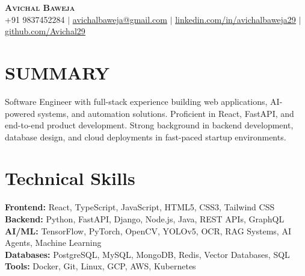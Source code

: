 \documentclass[letterpaper,10pt]{article}
\begin{document}
\begin{center}
    \textbf{\Huge \scshape Avichal Baweja} \\ \vspace{1pt}
    \small +91 9837452284 $|$ \href{mailto:avichalbaweja@gmail.com}{\underline{avichalbaweja@gmail.com}} $|$
    \href{https://www.linkedin.com/in/avichalbaweja29/}{\underline{linkedin.com/in/avichalbaweja29}} $|$
    \href{https://github.com/avichal29}{\underline{github.com/Avichal29}}
\end{center}

\section{SUMMARY}
Software Engineer with full-stack experience building web applications, AI-powered systems, and automation solutions. Proficient in React, FastAPI, and end-to-end product development. Strong background in backend development, database design, and cloud deployments in fast-paced startup environments.

\section{Technical Skills}
\begin{itemize}[leftmargin=0.2in, label={}]
    \small{\item{
    \textbf{Frontend:} React, TypeScript, JavaScript, HTML5, CSS3, Tailwind CSS \\
    \textbf{Backend:} Python, FastAPI, Django, Node.js, Java, REST APIs, GraphQL \\
    \textbf{AI/ML:} TensorFlow, PyTorch, OpenCV, YOLOv5, OCR, RAG Systems, AI Agents, Machine Learning \\
    \textbf{Databases:} PostgreSQL, MySQL, MongoDB, Redis, Vector Databases, SQL \\
    \textbf{Tools:} Docker, Git, Linux, GCP, AWS, Kubernetes \\
    }}
\end{itemize}
\end{document}
